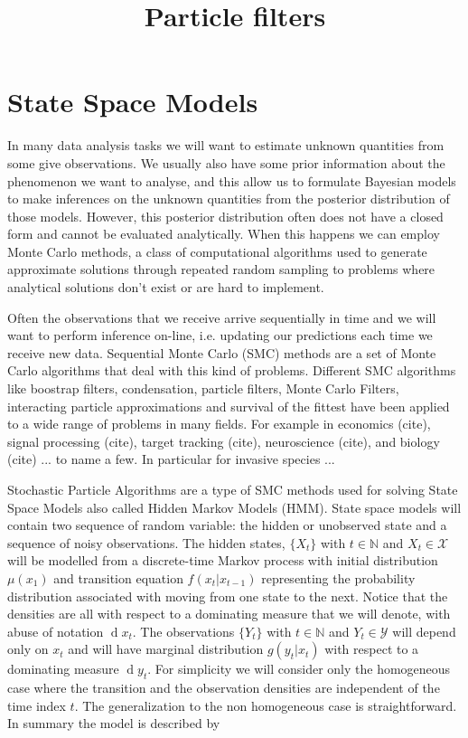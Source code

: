 \documentclass[11pt,a4paper]{article}
\title{Particle filters}
\renewcommand{\d}[1]{\ensuremath{\operatorname{d}\!{#1}}}
\begin{document}
\section{State Space Models}

In many data analysis tasks we will want to estimate unknown quantities from some give observations. We usually also have some prior information about the phenomenon we want to analyse, and this allow us to formulate Bayesian models to make inferences on the unknown quantities from the posterior distribution of those models. However, this posterior distribution often does not have a closed form and cannot be evaluated analytically. When this happens we can employ Monte Carlo methods, a class of computational algorithms used to generate approximate solutions through repeated random sampling to problems where analytical solutions don't exist or are hard to implement.

Often the observations that we receive arrive sequentially in time and we will want to perform inference on-line, i.e. updating our predictions each time we receive new data. Sequential Monte Carlo (SMC) methods are a set of Monte Carlo algorithms that deal with this kind of problems. 
Different SMC algorithms like boostrap filters, condensation, particle filters, Monte Carlo Filters, interacting particle approximations and survival of the fittest have been applied to a wide range of problems in many fields. For example in economics (cite), signal processing (cite), target tracking (cite), neuroscience (cite), and biology (cite) ... to name a few. In particular for invasive species ...

Stochastic Particle Algorithms are a type of SMC methods used for solving State Space Models also called Hidden Markov Models (HMM). State space models will contain two sequence of random variable: the hidden or unobserved state and a sequence of noisy observations. The hidden states, $\{ X_t \}$ with $t \in \mathbb{N}$ and $X_t \in \mathcal{X}$ will be modelled from a discrete-time Markov process with initial distribution $\mu(x_1)$ and transition equation $f(x_t | x_{t-1})$ representing the probability distribution associated with moving from one state to the next. Notice that the densities are all with respect to a dominating measure that we will denote, with abuse of notation $\d x_t$. The observations $\{ Y_t \}$ with $t \in \mathbb{N}$ and $Y_t \in \mathcal{Y}$ will depend only on $x_t$ and will have marginal distribution $g(y_t | x_t)$ with respect to a dominating measure $\d y_t$. For simplicity we will consider only the homogeneous case where the transition and the observation densities are independent of the time index $t$. The generalization to the non homogeneous case is straightforward. In summary the model is described by
\end{document}
